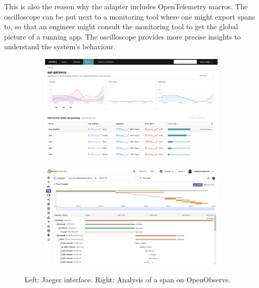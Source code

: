        This is also the reason why the adapter includes OpenTelemetry macros. The oscilloscope can be put next to a monitoring tool where one might export spans to, so that an engineer might consult the monitoring tool to get the global picture of a running app. The oscilloscope provides more precise insights to understand the system's behaviour. 
       \begin{figure}[H]
            \centering
            \begin{subfigure}{.5\textwidth}
                \centering
                \includegraphics[width=0.98\textwidth]{img/jaeger.png}
                \label{fig:jag}
            \end{subfigure}%
            \begin{subfigure}{.5\textwidth}
                \centering
                \includegraphics[width =0.98\textwidth]{img/jaeger2.jpg}
                \label{fig:openobs}
            \end{subfigure}
            \caption{Left: Jaeger interface. Right: Analysis of a span on OpenObserve.}
            \label{fig:monitor}
            \end{figure}

